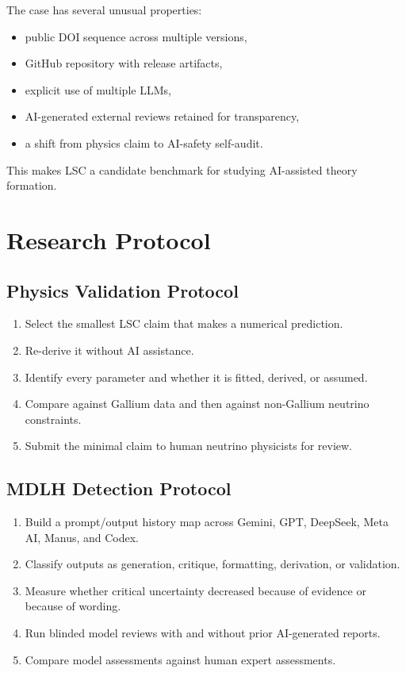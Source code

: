 \documentclass[11pt,a4paper]{article}
\begin{document}
The case has several unusual properties:

\begin{itemize}
  \item public DOI sequence across multiple versions,
  \item GitHub repository with release artifacts,
  \item explicit use of multiple LLMs,
  \item AI-generated external reviews retained for transparency,
  \item a shift from physics claim to AI-safety self-audit.
\end{itemize}

This makes LSC a candidate benchmark for studying AI-assisted theory formation.

\section{Research Protocol}

\subsection{Physics Validation Protocol}

\begin{enumerate}
  \item Select the smallest LSC claim that makes a numerical prediction.
  \item Re-derive it without AI assistance.
  \item Identify every parameter and whether it is fitted, derived, or assumed.
  \item Compare against Gallium data and then against non-Gallium neutrino constraints.
  \item Submit the minimal claim to human neutrino physicists for review.
\end{enumerate}

\subsection{MDLH Detection Protocol}

\begin{enumerate}
  \item Build a prompt/output history map across Gemini, GPT, DeepSeek, Meta AI, Manus, and Codex.
  \item Classify outputs as generation, critique, formatting, derivation, or validation.
  \item Measure whether critical uncertainty decreased because of evidence or because of wording.
  \item Run blinded model reviews with and without prior AI-generated reports.
  \item Compare model assessments against human expert assessments.
\end{enumerate}
\end{document}
